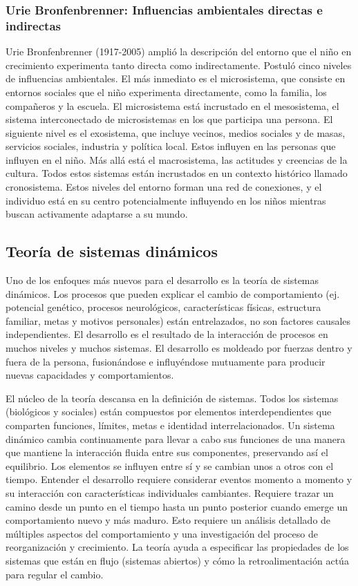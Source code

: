 \documentclass[11pt,letterpaper]{report}
\begin{document}
\subsubsection{Urie Bronfenbrenner: Influencias ambientales directas e indirectas}
Urie Bronfenbrenner (1917-2005) amplió la descripción del entorno que el niño
en crecimiento experimenta tanto directa como indirectamente. Postuló cinco
niveles de influencias ambientales. El más inmediato es el microsistema, que
consiste en entornos sociales que el niño experimenta directamente, como la
familia, los compañeros y la escuela. El microsistema está incrustado en el
mesosistema, el sistema interconectado de microsistemas en los que participa
una persona. El siguiente nivel es el exosistema, que incluye vecinos, medios
sociales y de masas, servicios sociales, industria y política local. Estos
influyen en las personas que influyen en el niño. Más allá está el
macrosistema, las actitudes y creencias de la cultura. Todos estos sistemas
están incrustados en un contexto histórico llamado cronosistema. Estos niveles
del entorno forman una red de conexiones, y el individuo está en su centro
potencialmente influyendo en los niños mientras buscan activamente adaptarse a
su mundo. \cite{Feldman3}

\subsection{Teoría de sistemas dinámicos}
Uno de los enfoques más nuevos para el desarrollo es la teoría de sistemas
dinámicos. Los procesos que pueden explicar el cambio de comportamiento (ej.
potencial genético, procesos neurológicos, características físicas,
estructura familiar, metas y motivos personales) están entrelazados, no son
factores causales independientes. El desarrollo es el resultado de la
interacción de procesos en muchos niveles y muchos sistemas. El desarrollo es
moldeado por fuerzas dentro y fuera de la persona, fusionándose e influyéndose
mutuamente para producir nuevas capacidades y comportamientos. \cite{Newman2020}

El núcleo de la teoría descansa en la definición de sistemas. Todos los
sistemas (biológicos y sociales) están compuestos por elementos
interdependientes que comparten funciones, límites, metas e identidad
interrelacionados. Un sistema dinámico cambia continuamente para llevar a cabo
sus funciones de una manera que mantiene la interacción fluida entre sus
componentes, preservando así el equilibrio. Los elementos se influyen entre sí
y se cambian unos a otros con el tiempo. Entender el desarrollo requiere
considerar eventos momento a momento y su interacción con características
individuales cambiantes. Requiere trazar un camino desde un punto en el tiempo
hasta un punto posterior cuando emerge un comportamiento nuevo y más maduro.
Esto requiere un análisis detallado de múltiples aspectos del comportamiento y
una investigación del proceso de reorganización y crecimiento. La teoría ayuda
a especificar las propiedades de los sistemas que están en flujo (sistemas
abiertos) y cómo la retroalimentación actúa para regular el cambio.
\cite{Feldman3}
\end{document}
